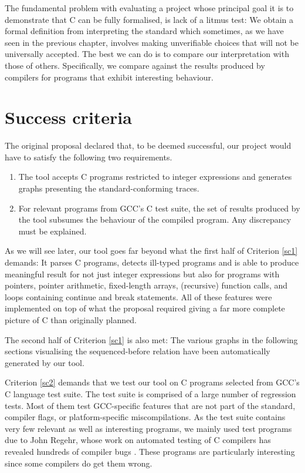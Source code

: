 \documentclass[a4paper,12pt]{scrbook}
\theoremstyle{plain}
\theoremstyle{definition}
\begin{document}
The fundamental problem with evaluating a project whose principal goal it is to
demonstrate that C can be fully formalised, is lack of a litmus test: We obtain
a formal definition from interpreting the standard which sometimes, as we have
seen in the previous chapter, involves making unverifiable choices that will not
be universally accepted. The best we can do is to compare our interpretation
with those of others. Specifically, we compare against the results produced by
compilers for programs that exhibit interesting behaviour.

\section{Success criteria}
The original proposal declared that, to be deemed successful, our project would
have to satisfy the following two requirements.

\begin{enumerate}
\item\label{sc1} The tool accepts C programs restricted to integer expressions
  and generates graphs presenting the standard-conforming traces.
\item\label{sc2} For relevant programs from GCC's C test suite, the set of
  results produced by the tool subsumes the behaviour of the compiled
  program. Any discrepancy must be explained.
\end{enumerate}

As we will see later, our tool goes far beyond what the first half of Criterion
\ref{sc1} demands: It parses C programs, detects ill-typed programs and is able
to produce meaningful result for not just integer expressions but also for
programs with pointers, pointer arithmetic, fixed-length arrays, (recursive)
function calls, and loops containing continue and break statements. All of these
features were implemented on top of what the proposal required giving a far more
complete picture of C than originally planned.

The second half of Criterion \ref{sc1} is also met: The various graphs in the
following sections visualising the sequenced-before relation have been
automatically generated by our tool.

Criterion \ref{sc2} demands that we test our tool on C programs selected from
GCC's C language test suite. The test suite is comprised of a large number of
regression tests. Most of them test GCC-specific features that are not part of
the standard, compiler flags, or platform-specific miscompilations. As the test
suite contains very few relevant as well as interesting programs, we mainly used
test programs due to John Regehr, whose work on automated testing of C compilers
has revealed hundreds of compiler bugs \cite{regehr}. These programs are
particularly interesting since some compilers do get them wrong.
\end{document}
